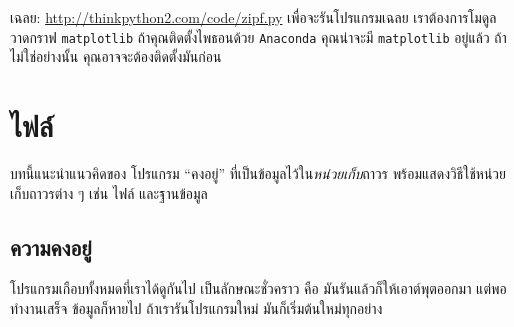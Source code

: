 \begin{exercise}

เฉลย:
 \url{http://thinkpython2.com/code/zipf.py}
เพื่อจะรันโปรแกรมเฉลย เราต้องการโมดูลวาดกราฟ \texttt{matplotlib}
ถ้าคุณติดตั้งไพธอนด้วย \texttt{Anaconda}
คุณน่าจะมี \texttt{matplotlib} อยู่แล้ว
ถ้าไม่ใช่อย่างนั้น คุณอาจจะต้องติดตั้งมันก่อน


\end{exercise}
\vspace{0.5cm}



\chapter{ไฟล์}


บทนี้แนะนำแนวคิดของ โปรแกรม ``คงอยู่''
ที่เป็นข้อมูลไว้ใน\textit{หน่วยเก็บ}ถาวร
พร้อมแสดงวิธีใช้หน่วยเก็บถาวรต่าง ๆ เช่น ไฟล์ และฐานข้อมูล

\section{ความคงอยู่}



โปรแกรมเกือบทั้งหมดที่เราได้ดูกันไป เป็นลักษณะชั่วคราว
คือ มันรันแล้วก็ให้เอาต์พุตออกมา
แต่พอทำงานเสร็จ ข้อมูลก็หายไป
ถ้าเรารันโปรแกรมใหม่ มันก็เริ่มต้นใหม่ทุกอย่าง


